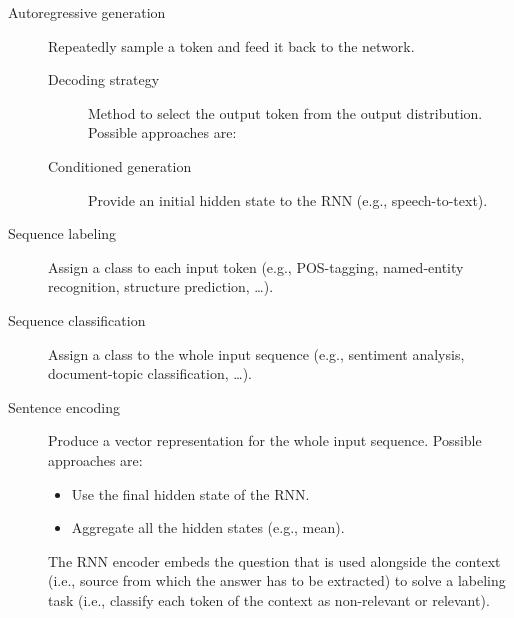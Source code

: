 \begin{description}
    \item[Autoregressive generation] 
        Repeatedly sample a token and feed it back to the network.

        \begin{description}
            \item[Decoding strategy] 
                Method to select the output token from the output distribution. Possible approaches are:
        \end{description}

        \begin{description}
            \item[Conditioned generation] 
                Provide an initial hidden state to the RNN (e.g., speech-to-text).
        \end{description}

    \item[Sequence labeling] 
        Assign a class to each input token (e.g., POS-tagging, named-entity recognition, structure prediction, \dots).

    \item[Sequence classification] 
        Assign a class to the whole input sequence (e.g., sentiment analysis, document-topic classification, \dots).

    \item[Sentence encoding] 
        Produce a vector representation for the whole input sequence.
        Possible approaches are:
        \begin{itemize}
            \item Use the final hidden state of the RNN.
            \item Aggregate all the hidden states (e.g., mean).
        \end{itemize}
    
        \begin{example}
            The RNN encoder embeds the question that is used alongside the context (i.e., source from which the answer has to be extracted) to solve a labeling task (i.e., classify each token of the context as non-relevant or relevant).
        \end{example}
\end{description}
